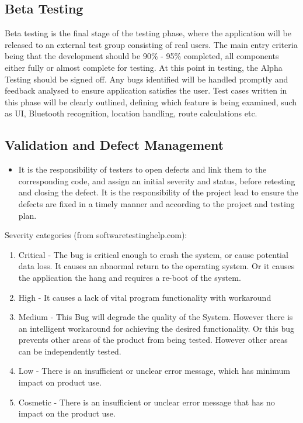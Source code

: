 \documentclass[12pt]{article}
\begin{document}
\subsection{Beta Testing}
Beta testing %
is the final stage of the testing phase, where the application will be released to an external test group consisting of real users. The main entry criteria being that the development should be 90\% - 95\% completed, all components either fully or almost complete for testing. At this point in testing, the Alpha Testing should be signed off. Any bugs identified will be handled promptly and feedback analysed to ensure application satisfies the user. Test cases written in this phase will be clearly outlined, defining which feature is being examined, such as UI, Bluetooth recognition, location handling, route calculations etc.


\subsection{Validation and Defect Management}
\begin{itemize}
    \item It is the responsibility of testers to open defects and link them to the corresponding code, and assign an initial severity and status, before retesting and closing the defect. It is the responsibility of the project lead to ensure the defects are fixed in a timely manner and according to the project and testing plan. 
\end{itemize}

Severity categories (from softwaretestinghelp.com):
\begin{enumerate}
    \item Critical - The bug is critical enough to crash the system, or cause potential data loss. It causes an abnormal return to the operating system. Or it causes the application the hang and requires a re-boot of the system.
    \item High - It causes a lack of vital program functionality with workaround
    \item Medium - This Bug will degrade the quality of the System. However there is an intelligent workaround for achieving the desired functionality. Or this bug prevents other areas of the product from being tested. However other areas can be independently tested.
    \item Low - There is an insufficient or unclear error message, which has minimum impact on product use.
    \item Cosmetic - There is an insufficient or unclear error message that has no impact on the product use.
\end{enumerate}
\end{document}
